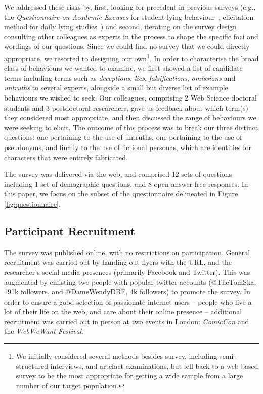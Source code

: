 \documentclass{sig-alternate}
\begin{document}
We addressed these risks by, first, looking for precedent in previous surveys (e.g., the \emph{Questionnaire on Academic Excuses} for student lying behaviour~\cite{roig2005lying}, elicitation method for daily lying studies~\cite{depaulo1996lying}) and second, iterating on the survey design consulting other colleagues as experts in the process to shape the specific foci and wordings of our questions. Since we could find no survey that we could directly appropriate, we resorted to designing our own\footnote{We initially considered several methods besides survey, including semi-structured interviews, and artefact examinations, but fell back to a web-based survey to be the most appropriate for getting a wide sample from a large number of our target population.}.  In order to characterise the broad class of behaviours we wanted to examine, we first  showed a list of candidate terms including terms such as \emph{deceptions}, \emph{lies}, \emph{falsifications}, \emph{omissions} and \emph{untruths} to several experts, alongside a small but diverse list of example behaviours we wished to seek.  Our colleagues, comprising 2 Web Science doctoral students and 3 postdoctoral researchers, gave us feedback about which term(s) they considered most appropriate, and then discussed the range of behaviours we were seeking to elicit.  The outcome of this process was to break our three distinct questions: one pertaining to the use of untruths, one pertaining to the use of pseudonyms, and finally to the use of fictional personas, which are identities for characters that were entirely fabricated.

The survey was delivered via the web, and comprised 12 sets of questions including 1 set of demographic questions, and 8 open-answer free responses. In this paper, we focus on the subset of the questionnaire delineated in Figure \ref{fig:questionnaire}.

\subsection{Participant Recruitment}

The survey was published online, with no restrictions on participation. General recruitment was carried out by handing out flyers with the URL, and the researcher's social media presences (primarily Facebook and Twitter). This was augmented by enlisting two people with popular twitter accounts (@TheTomSka, 191k followers, and @DameWendyDBE, 4k followers) to promote the survey.
In order to ensure a good selection of passionate internet users -- people who live a lot of their life on the web, and care about their online presence -- additional recruitment 
was carried out in person at two events in London: \emph{ComicCon} and the \emph{WebWeWant Festival}.
\end{document}
